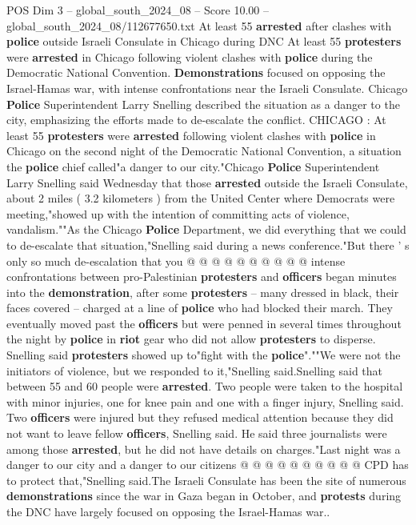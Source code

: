 \begin{textsample}{POS Dim 3 – global\_south\_2024\_08 – Score 10.00 – global\_south\_2024\_08/112677650.txt}  \label{ex:f3_pos_338}
At least 55 \textbf{arrested} after clashes with \textbf{police} outside Israeli Consulate in Chicago during DNC At least 55 \textbf{protesters} were \textbf{arrested} in Chicago following violent clashes with \textbf{police} during the Democratic National Convention. \textbf{Demonstrations} focused on opposing the Israel-Hamas war, with intense confrontations near the Israeli Consulate.
Chicago \textbf{Police} Superintendent Larry Snelling described the situation as a danger to the city, emphasizing the efforts made to de-escalate the conflict.
CHICAGO : At least 55 \textbf{protesters} were \textbf{arrested} following violent clashes with \textbf{police} in Chicago on the second night of the Democratic National Convention, a situation the \textbf{police} chief called"a danger to our city."Chicago \textbf{Police} Superintendent Larry Snelling said Wednesday that those \textbf{arrested} outside the Israeli Consulate, about 2 miles ( 3.2 kilometers ) from the United Center where Democrats were meeting,"showed up with the intention of committing acts of violence, vandalism.""As the Chicago \textbf{Police} Department, we did everything that we could to de-escalate that situation,"Snelling said during a news conference."But there ' s only so much de-escalation that you @ @ @ @ @ @ @ @ @ @ intense confrontations between pro-Palestinian \textbf{protesters} and \textbf{officers} began minutes into the \textbf{demonstration}, after some \textbf{protesters} -- many dressed in black, their faces covered -- charged at a line of \textbf{police} who had blocked their march.
They eventually moved past the \textbf{officers} but were penned in several times throughout the night by \textbf{police} in \textbf{riot} gear who did not allow \textbf{protesters} to disperse.
Snelling said \textbf{protesters} showed up to"fight with the \textbf{police}".""We were not the initiators of violence, but we responded to it,"Snelling said.Snelling said that between 55 and 60 people were \textbf{arrested}.
Two people were taken to the hospital with minor injuries, one for knee pain and one with a finger injury, Snelling said.
Two \textbf{officers} were injured but they refused medical attention because they did not want to leave fellow \textbf{officers}, Snelling said.
He said three journalists were among those \textbf{arrested}, but he did not have details on charges."Last night was a danger to our city and a danger to our citizens @ @ @ @ @ @ @ @ @ @ CPD has to protect that,"Snelling said.The Israeli Consulate has been the site of numerous \textbf{demonstrations} since the war in Gaza began in October, and \textbf{protests} during the DNC have largely focused on opposing the Israel-Hamas war..

\end{textsample}
